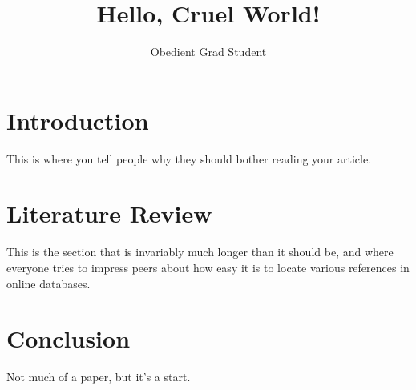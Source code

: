 \documentclass{article}
\title{Hello, Cruel World!}
\author{Obedient Grad Student}
\begin{document}
\maketitle

\section{Introduction}
This is where you tell people why they should bother reading your article.

\section{Literature Review}
This is the section that is invariably much longer than it should be, and
where everyone tries to impress peers about how easy it is to locate various
references in online databases.

\section{Conclusion}
Not much of a paper, but it's a start.
\end{document}
